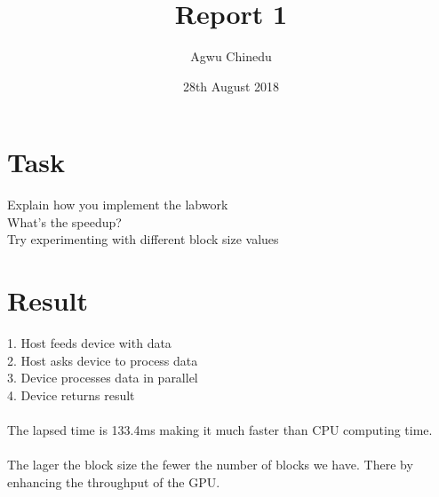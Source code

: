 \documentclass[letterpaper,12pt]{article}
\begin{document}
\title{Report 1}
\author{Agwu Chinedu}
\date{28th August 2018}
\maketitle


\section{Task}
Explain how you implement the labwork \\
What’s the speedup?\\
Try experimenting with different block size values\\


\section{Result}
1. Host feeds device with data\\
2. Host asks device to process data\\
3. Device processes data in parallel\\
4. Device returns result\\
\paragraph{}
The lapsed time is 133.4ms making it much faster than CPU computing time.
\paragraph{}
The lager the block size the fewer the number of blocks we have. There by enhancing the throughput of the GPU.
\end{document}
